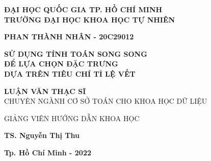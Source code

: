 \newpage
\thispagestyle{empty}
\begin{center}
	{\bf  ĐẠI HỌC QUỐC GIA TP. HỒ CHÍ MINH}\\
	{\bf TRƯỜNG ĐẠI HỌC KHOA HỌC TỰ NHIÊN}
	
	\vspace*{1.5cm}
	
	{\bf  PHAN THÀNH NHÂN - 20C29012}
	
	\vspace*{1.5cm}
	
	{\huge\bf SỬ DỤNG TÍNH TOÁN SONG SONG\\
	ĐỂ LỰA CHỌN ĐẶC TRƯNG\\
	DỰA TRÊN TIÊU CHÍ TỈ LỆ VẾT	
}
	
	\vspace*{1.5cm}
	
	{\large\bf LUẬN VĂN THẠC SĨ}\\[20pt]
	CHUYÊN NGÀNH CƠ SỞ TOÁN CHO KHOA HỌC DỮ LIỆU
	
	\vspace*{1.5cm}
	
	GIẢNG VIÊN HƯỚNG DẪN KHOA HỌC
	
	{\bf TS. Nguyễn Thị Thu}
	
	\vfill
	{\bf Tp. Hồ Chí Minh - 2022}
\end{center}

